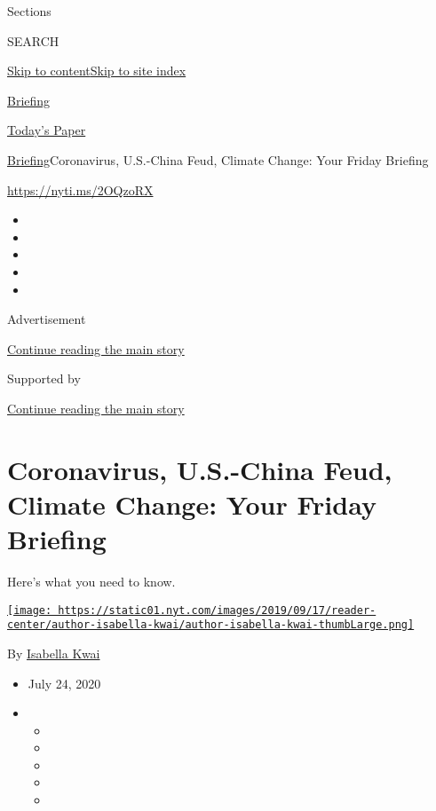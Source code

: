 Sections

SEARCH

\protect\hyperlink{site-content}{Skip to
content}\protect\hyperlink{site-index}{Skip to site index}

\href{https://www.nytimes.com/interactive/2018/briefing/global-morning-briefing-newsletter-signup.html}{Briefing}

\href{https://myaccount.nytimes.com/auth/login?response_type=cookie\&client_id=vi}{}

\href{https://www.nytimes.com/section/todayspaper}{Today's Paper}

\href{/interactive/2018/briefing/global-morning-briefing-newsletter-signup.html}{Briefing}\textbar{}Coronavirus,
U.S.-China Feud, Climate Change: Your Friday Briefing

\url{https://nyti.ms/2OQzoRX}

\begin{itemize}
\item
\item
\item
\item
\item
\end{itemize}

Advertisement

\protect\hyperlink{after-top}{Continue reading the main story}

Supported by

\protect\hyperlink{after-sponsor}{Continue reading the main story}

\hypertarget{coronavirus-us-china-feud-climate-change-your-friday-briefing}{%
\section{Coronavirus, U.S.-China Feud, Climate Change: Your Friday
Briefing}\label{coronavirus-us-china-feud-climate-change-your-friday-briefing}}

Here's what you need to know.

\href{https://www.nytimes.com/by/isabella-kwai}{\texttt{[image: https://static01.nyt.com/images/2019/09/17/reader-center/author-isabella-kwai/author-isabella-kwai-thumbLarge.png]}}

By \href{https://www.nytimes.com/by/isabella-kwai}{Isabella Kwai}

\begin{itemize}
\item
  July 24, 2020
\item
  \begin{itemize}
  \item
  \item
  \item
  \item
  \item
  \end{itemize}
\end{itemize}

